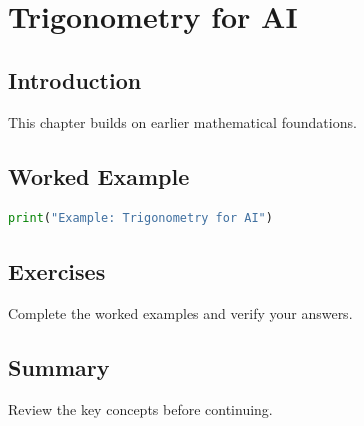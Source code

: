 \chapter{Trigonometry for AI}
\label{chap:vol4-8}



\section{Introduction}
This chapter builds on earlier mathematical foundations.

\section{Worked Example}
\begin{lstlisting}[language=Python]
print("Example: Trigonometry for AI")
\end{lstlisting}

\section{Exercises}
\begin{exercise}
Complete the worked examples and verify your answers.
\end{exercise}

\section{Summary}
Review the key concepts before continuing.
